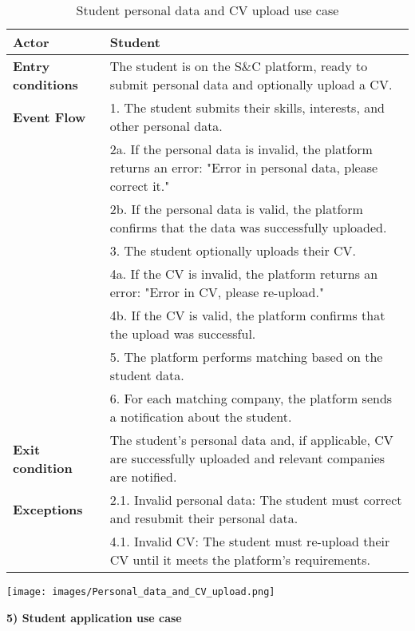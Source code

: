 \begin{table}[h!]
    \centering
    \begin{tabular}{lp{10cm}}
        \textbf{Actor} & Student \\ \hline
        \textbf{Entry conditions} & The student is on the S\&C platform, ready to submit personal data and optionally upload a CV. \\ \hline
        \textbf{Event Flow} & 
        1. The student submits their skills, interests, and other personal data. \\
        & 2a. If the personal data is invalid, the platform returns an error: "Error in personal data, please correct it." \\
        & 2b. If the personal data is valid, the platform confirms that the data was successfully uploaded. \\
        & 3. The student optionally uploads their CV. \\
        & 4a. If the CV is invalid, the platform returns an error: "Error in CV, please re-upload." \\
        & 4b. If the CV is valid, the platform confirms that the upload was successful. \\
        & 5. The platform performs matching based on the student data. \\
        & 6. For each matching company, the platform sends a notification about the student. \\
        \hline
        \textbf{Exit condition} & The student's personal data and, if applicable, CV are successfully uploaded and relevant companies are notified. \\ \hline
        \textbf{Exceptions} & 
        2.1. Invalid personal data: The student must correct and resubmit their personal data. \\
        & 4.1. Invalid CV: The student must re-upload their CV until it meets the platform's requirements. \\
    \end{tabular}
    \caption{Student personal data and CV upload use case}
    \label{tab:student_data_cv_upload}
\end{table}



\begin{center}
    \texttt{[image: images/Personal\_data\_and\_CV\_upload.png]}
\end{center}

\newpage
\textbf{5) Student application use case}\\

